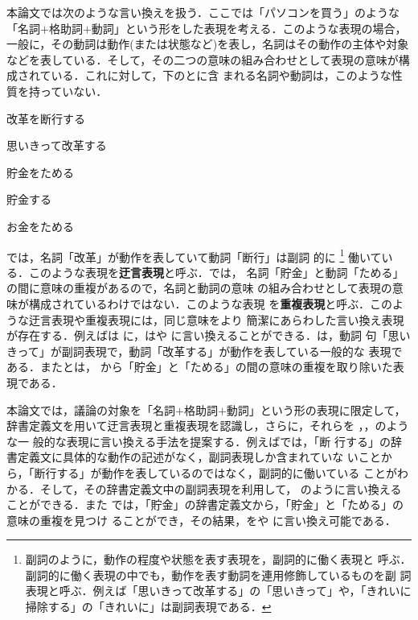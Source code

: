\documentclass{nlp}
\begin{document}
本論文では次のような言い換えを扱う．ここでは「パソコンを買う」のような
「名詞$+$格助詞$+$動詞」という形をした表現を考える．このような表現の場合，
一般に，その動詞は動作(または状態など)を表し，名詞はその動作の主体や対象
などを表している．そして，その二つの意味の組み合わせとして表現の意味が構
成されている．これに対して，下のとに含
まれる名詞や動詞は，このような性質を持っていない．
\begin{EXAMPLE}
 \item 改革を断行する 
 \item 思いきって改革する 
\end{EXAMPLE}
\begin{EXAMPLE}
 \item 貯金をためる   
 \item 貯金する           
 \item お金をためる        
\end{EXAMPLE}
では，名詞「改革」が動作を表していて動詞「断行」は副詞
的に
\footnote{副詞のように，動作の程度や状態を表す表現を，副詞的に働く表現と
呼ぶ．副詞的に働く表現の中でも，動作を表す動詞を連用修飾しているものを副
詞表現と呼ぶ．例えば「思いきって改革する」の「思いきって」や，「きれいに
掃除する」の「きれいに」は副詞表現である．}
働いている．このような表現を{\bf 迂言表現}と呼ぶ．では，
名詞「貯金」と動詞「ためる」の間に意味の重複があるので，名詞と動詞の意味
の組み合わせとして表現の意味が構成されているわけではない．このような表現
を{\bf 重複表現}と呼ぶ．このような迂言表現や重複表現には，同じ意味をより
簡潔にあらわした言い換え表現が存在する．例えばは
に，はや
に言い換えることができる．は，動詞
句「思いきって」が副詞表現で，動詞「改革する」が動作を表している一般的な
表現である．またとは，
から「貯金」と「ためる」の間の意味の重複を取り除いた表
現である．

本論文では，議論の対象を「名詞$+$格助詞$+$動詞」という形の表現に限定して，
辞書定義文を用いて迂言表現と重複表現を認識し，さらに，それらを
，，のような一
般的な表現に言い換える手法を提案する．例えばでは，「断
行する」の辞書定義文に具体的な動作の記述がなく，副詞表現しか含まれていな
いことから，「断行する」が動作を表しているのではなく，副詞的に働いている
ことがわかる．そして，その辞書定義文中の副詞表現を利用して，
のように言い換えることができる．また
では，「貯金」の辞書定義文から，「貯金」と「ためる」の意味の重複を見つけ
ることができ，その結果，をや
に言い換え可能である．
\end{document}
